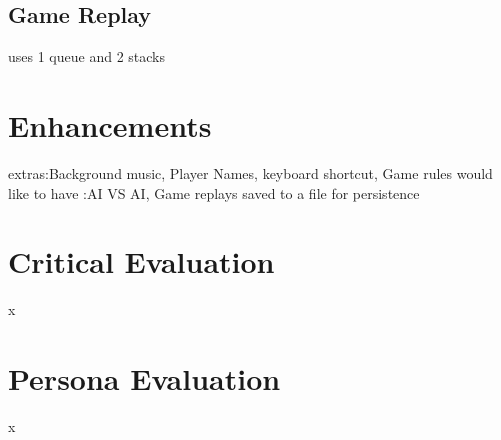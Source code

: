 \documentclass[10pt, a4paper]{article}
\begin{document}
	\subsection{Game Replay}
	uses 1 queue and 2 stacks 

	\section{Enhancements}
	extras:Background music, Player Names, keyboard shortcut, Game rules
	would like to have :AI VS AI, Game replays saved to a file for persistence
	
	\section{Critical Evaluation}
	x

	\section{Persona Evaluation}
	x
    
   
   


		
\end{document}
